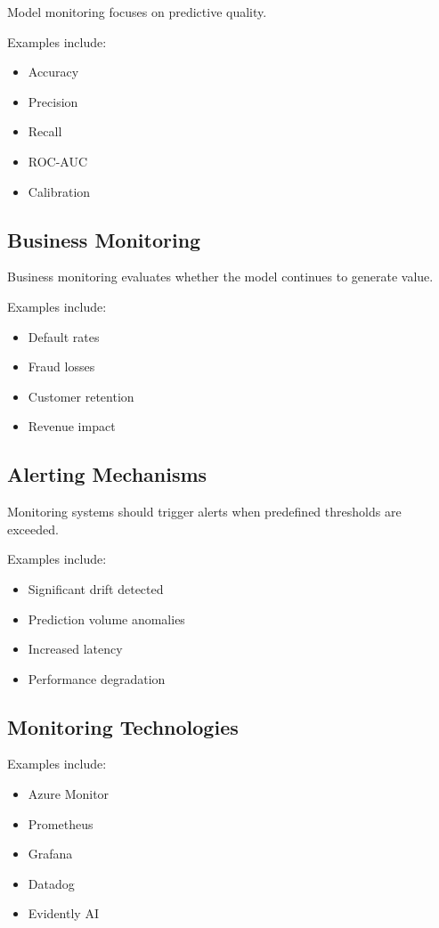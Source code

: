 Model monitoring focuses on predictive quality.

Examples include:

\begin{itemize}
    \item Accuracy
    \item Precision
    \item Recall
    \item ROC-AUC
    \item Calibration
\end{itemize}

\subsection{Business Monitoring}

Business monitoring evaluates whether the model continues to generate value.

Examples include:

\begin{itemize}
    \item Default rates
    \item Fraud losses
    \item Customer retention
    \item Revenue impact
\end{itemize}

\subsection{Alerting Mechanisms}

Monitoring systems should trigger alerts when predefined thresholds are exceeded.

Examples include:

\begin{itemize}
    \item Significant drift detected
    \item Prediction volume anomalies
    \item Increased latency
    \item Performance degradation
\end{itemize}

\subsection{Monitoring Technologies}

Examples include:

\begin{itemize}
    \item Azure Monitor
    \item Prometheus
    \item Grafana
    \item Datadog
    \item Evidently AI
\end{itemize}

